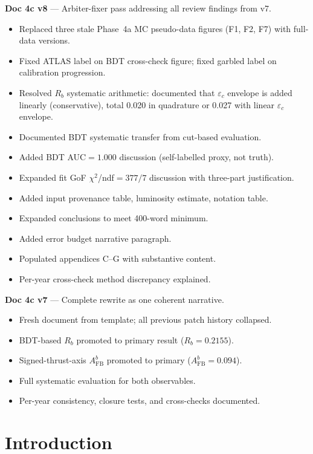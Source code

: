 \documentclass[11pt,a4paper]{article}
\begin{document}
\textbf{Doc 4c v8} --- Arbiter-fixer pass addressing all review findings from v7.
\begin{itemize}
\item Replaced three stale Phase~4a MC pseudo-data figures (F1, F2, F7) with full-data versions.
\item Fixed ATLAS label on BDT cross-check figure; fixed garbled label on calibration progression.
\item Resolved $R_b$ systematic arithmetic: documented that $\varepsilon_c$ envelope is added linearly (conservative), total 0.020 in quadrature or 0.027 with linear $\varepsilon_c$ envelope.
\item Documented BDT systematic transfer from cut-based evaluation.
\item Added BDT AUC${}=1.000$ discussion (self-labelled proxy, not truth).
\item Expanded fit GoF $\chi^2$/ndf${}=377/7$ discussion with three-part justification.
\item Added input provenance table, luminosity estimate, notation table.
\item Expanded conclusions to meet 400-word minimum.
\item Added error budget narrative paragraph.
\item Populated appendices C--G with substantive content.
\item Per-year cross-check method discrepancy explained.
\end{itemize}

\textbf{Doc 4c v7} --- Complete rewrite as one coherent narrative.
\begin{itemize}
\item Fresh document from template; all previous patch history collapsed.
\item BDT-based $R_b$ promoted to primary result ($R_b = 0.2155$).
\item Signed-thrust-axis $A_\mathrm{FB}^b$ promoted to primary ($A_\mathrm{FB}^b = 0.094$).
\item Full systematic evaluation for both observables.
\item Per-year consistency, closure tests, and cross-checks documented.
\end{itemize}

\clearpage

\section{Introduction}
\label{sec:intro}
\end{document}

